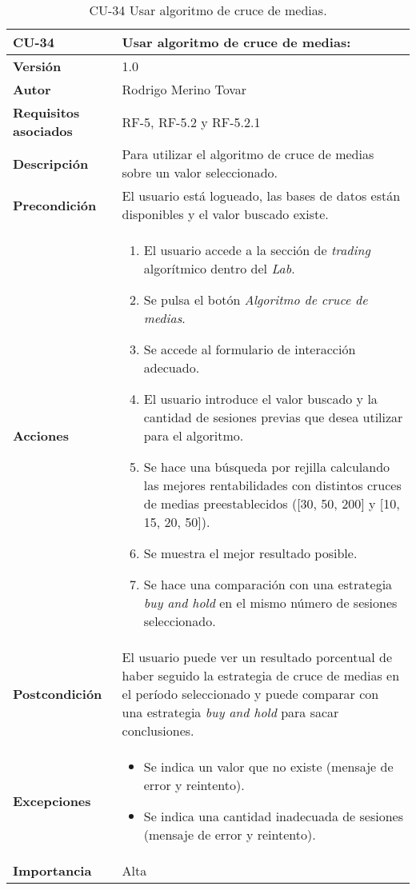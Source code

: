 \begin{table}[p]
	\centering
	\begin{tabularx}{\linewidth}{ p{} p{} }
		\toprule
		\textbf{CU-34}    & \textbf{Usar algoritmo de cruce de medias:}\\
		\toprule
		\textbf{Versión}              & 1.0    \\
		\textbf{Autor}                & Rodrigo Merino Tovar \\
		\textbf{Requisitos asociados} & RF-5, RF-5.2 y RF-5.2.1   \\
		\textbf{Descripción}          & Para utilizar el algoritmo de cruce de medias sobre un valor seleccionado.\\
		\textbf{Precondición}         & El usuario está logueado, las bases de datos están disponibles y el valor buscado existe.  \\
		\textbf{Acciones}             &
		\begin{enumerate}
			\def\labelenumi{\arabic{enumi}.}
			\tightlist 
			\item El usuario accede a la sección de \emph{trading} algorítmico dentro del \emph{Lab}.
			\item Se pulsa el botón \emph{Algoritmo de cruce de medias}. 
			\item Se accede al formulario de interacción adecuado. 
			\item El usuario introduce el valor buscado y la cantidad de sesiones previas que desea utilizar para el algoritmo.
			\item Se hace una búsqueda por rejilla calculando las mejores rentabilidades con distintos cruces de medias preestablecidos ([30, 50, 200] y [10, 15, 20, 50]).
			\item Se muestra el mejor resultado posible. 
			\item Se hace una comparación con una estrategia \emph{buy and hold} en el mismo número de sesiones seleccionado.
		\end{enumerate}\\
		\textbf{Postcondición}        & El usuario puede ver un resultado porcentual de haber seguido la estrategia de cruce de medias en el período seleccionado y puede comparar con una estrategia \emph{buy and hold} para sacar conclusiones. \\
		\textbf{Excepciones}          & 
		\begin{itemize}
			\tightlist
			\item Se indica un valor que no existe (mensaje de error y reintento).
			\item Se indica una cantidad inadecuada de sesiones (mensaje de error y reintento).
		\end{itemize} \\
		\textbf{Importancia}          & Alta \\
		\bottomrule
	\end{tabularx}
	\caption{CU-34 Usar algoritmo de cruce de medias.}
\end{table}



